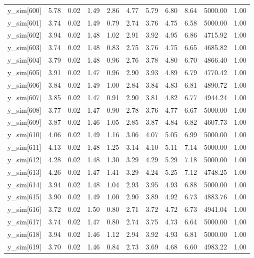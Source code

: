\begin{table}[ht]
\begin{tabular}{rrrrrrrrrrr}
  y\_sim[600] & 5.78 & 0.02 & 1.49 & 2.86 & 4.77 & 5.79 & 6.80 & 8.64 & 5000.00 & 1.00 \\ 
  y\_sim[601] & 3.74 & 0.02 & 1.49 & 0.79 & 2.74 & 3.76 & 4.75 & 6.58 & 5000.00 & 1.00 \\ 
  y\_sim[602] & 3.94 & 0.02 & 1.48 & 1.02 & 2.91 & 3.92 & 4.95 & 6.86 & 4715.92 & 1.00 \\ 
  y\_sim[603] & 3.74 & 0.02 & 1.48 & 0.83 & 2.75 & 3.76 & 4.75 & 6.65 & 4685.82 & 1.00 \\ 
  y\_sim[604] & 3.79 & 0.02 & 1.48 & 0.96 & 2.76 & 3.78 & 4.80 & 6.70 & 4866.40 & 1.00 \\ 
  y\_sim[605] & 3.91 & 0.02 & 1.47 & 0.96 & 2.90 & 3.93 & 4.89 & 6.79 & 4770.42 & 1.00 \\ 
  y\_sim[606] & 3.84 & 0.02 & 1.49 & 1.00 & 2.84 & 3.84 & 4.83 & 6.81 & 4890.72 & 1.00 \\ 
  y\_sim[607] & 3.85 & 0.02 & 1.47 & 0.91 & 2.90 & 3.81 & 4.82 & 6.77 & 4944.24 & 1.00 \\ 
  y\_sim[608] & 3.77 & 0.02 & 1.47 & 0.90 & 2.78 & 3.76 & 4.77 & 6.67 & 5000.00 & 1.00 \\ 
  y\_sim[609] & 3.87 & 0.02 & 1.46 & 1.05 & 2.85 & 3.87 & 4.84 & 6.82 & 4607.73 & 1.00 \\ 
  y\_sim[610] & 4.06 & 0.02 & 1.49 & 1.16 & 3.06 & 4.07 & 5.05 & 6.99 & 5000.00 & 1.00 \\ 
  y\_sim[611] & 4.13 & 0.02 & 1.48 & 1.25 & 3.14 & 4.10 & 5.11 & 7.14 & 5000.00 & 1.00 \\ 
  y\_sim[612] & 4.28 & 0.02 & 1.48 & 1.30 & 3.29 & 4.29 & 5.29 & 7.18 & 5000.00 & 1.00 \\ 
  y\_sim[613] & 4.26 & 0.02 & 1.47 & 1.41 & 3.29 & 4.24 & 5.25 & 7.12 & 4748.25 & 1.00 \\ 
  y\_sim[614] & 3.94 & 0.02 & 1.48 & 1.04 & 2.93 & 3.95 & 4.93 & 6.88 & 5000.00 & 1.00 \\ 
  y\_sim[615] & 3.90 & 0.02 & 1.49 & 1.00 & 2.90 & 3.89 & 4.92 & 6.73 & 4883.76 & 1.00 \\ 
  y\_sim[616] & 3.72 & 0.02 & 1.50 & 0.80 & 2.71 & 3.72 & 4.72 & 6.73 & 4941.04 & 1.00 \\ 
  y\_sim[617] & 3.74 & 0.02 & 1.47 & 0.80 & 2.74 & 3.75 & 4.73 & 6.64 & 5000.00 & 1.00 \\ 
  y\_sim[618] & 3.94 & 0.02 & 1.46 & 1.12 & 2.94 & 3.92 & 4.93 & 6.81 & 5000.00 & 1.00 \\ 
  y\_sim[619] & 3.70 & 0.02 & 1.46 & 0.84 & 2.73 & 3.69 & 4.68 & 6.60 & 4983.22 & 1.00 \\ 

\end{tabular}
\end{table}
